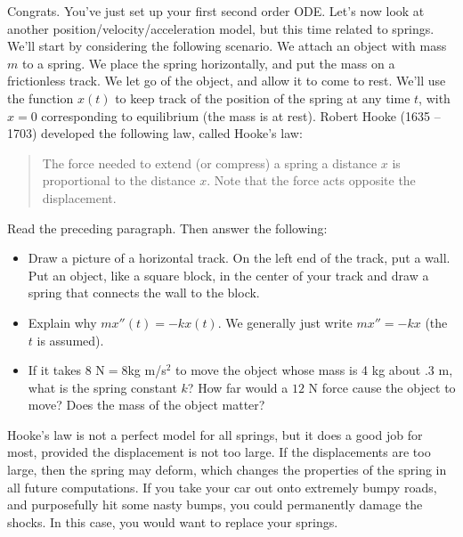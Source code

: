 Congrats.  You've just set up your first second order ODE. 
Let's now look at another position/velocity/acceleration model, but this time related to springs. 
We'll start by considering the following scenario. We attach an object with mass $m$ to a spring.  
We place the spring horizontally, and put the mass on a frictionless track. We let go of the object, and allow it to come to rest. We'll use the function $x(t)$ to keep track of the position of the spring at any time $t$, with $x=0$ corresponding to equilibrium (the mass is at rest). Robert Hooke (1635 -- 1703) developed the following law, called Hooke's law:
\begin{quote}
 The force needed to extend (or compress) a spring a distance $x$ is proportional to the distance $x$. Note that the force acts opposite the displacement.
\end{quote}
\begin{problem}
 Read the preceding paragraph.  Then answer the following:
\begin{itemize}
 \item Draw a picture of a horizontal track. On the left end of the track, put a wall. Put an object, like a square block, in the center of your track and draw a spring that connects the wall to the block.
 \item Explain why $mx''(t)=-kx(t)$. We generally just write $mx''=-kx$ (the $t$ is assumed).  
 \item If it takes $8 \text{ N} = 8$kg m/s$^2$ to move the object whose mass is 4 kg about $.3$ m, what is the spring constant $k$?  How far would a $12$ N force cause the object to move? Does the mass of the object matter?
\end{itemize}
\end{problem}

Hooke's law is not a perfect model for all springs, but it does a good job for most, provided the displacement is not too large.  If the displacements are too large, then the spring may deform, which changes the properties of the spring in all future computations.  If you take your car out onto extremely bumpy roads, and purposefully hit some nasty bumps, you could permanently damage the shocks. In this case, you would want to replace your springs.

